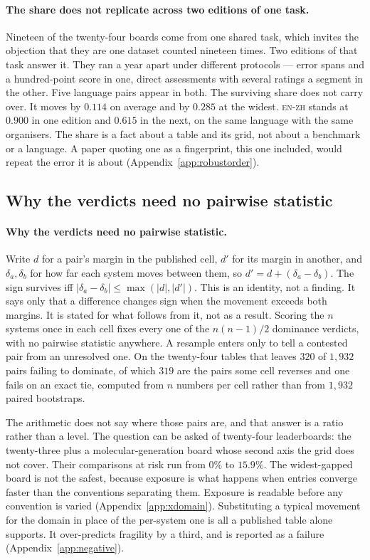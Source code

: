 \documentclass{article}
\begin{document}
\paragraph{The share does not replicate across two editions of one task.} Nineteen of
the twenty-four boards come from one shared task, which invites the objection that they are one
dataset counted nineteen times. Two editions of that task answer it. They ran a year apart under
different protocols --- error spans and a hundred-point score in one, direct assessments with several
ratings a segment in the other. Five language pairs appear in both. The surviving share does not
carry over. It moves by $0.114$ on average and by $0.285$ at the widest. \textsc{en-zh} stands at
$0.900$ in one edition and $0.615$ in the next, on the same language with the same organisers. The
share is a fact about a table and its grid, not about a benchmark or a language. A paper quoting one
as a fingerprint, this one included, would repeat the error it is about
(Appendix~\ref{app:robustorder}).

\subsection{Why the verdicts need no pairwise statistic}
\label{sec:arith}

\paragraph{Why the verdicts need no pairwise statistic.} Write $d$ for a pair's margin in the published cell, $d'$ for its margin in another,
and $\delta_a,\delta_b$ for how far each system moves between them, so $d'=d+(\delta_a-\delta_b)$.
The sign survives iff $|\delta_a-\delta_b|\le\max(|d|,|d'|)$. This is an identity, not a finding. It
says only that a difference changes sign when the movement exceeds both margins. It is stated for
what follows from it, not as a result. Scoring the $n$ systems once in each cell fixes every one of
the $n(n-1)/2$ dominance verdicts, with no pairwise statistic anywhere. A resample enters only to
tell a contested pair from an unresolved one. On the twenty-four tables that leaves $320$ of
$1{,}932$ pairs failing to dominate, of which $319$ are the pairs some cell reverses and one fails
on an exact tie, computed from $n$ numbers per cell rather than from $1{,}932$ paired bootstraps.

The arithmetic does not say where those pairs are, and that answer is a ratio rather than a level.
The question can be asked of twenty-four leaderboards: the twenty-three plus a molecular-generation
board whose second axis the grid does not cover. Their comparisons at risk run from $0\%$ to
$15.9\%$. The widest-gapped board is not the safest, because exposure is what happens when entries
converge faster than the conventions separating them. Exposure is readable before any convention is
varied (Appendix~\ref{app:xdomain}). Substituting a typical movement for the domain in place of the
per-system one is all a published table alone supports. It over-predicts fragility by a third, and
is reported as a failure (Appendix~\ref{app:negative}).
\end{document}
